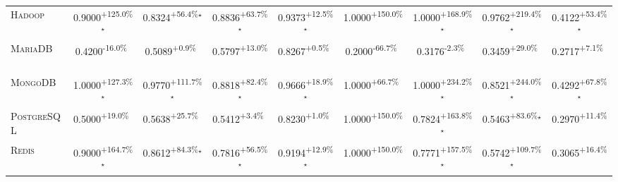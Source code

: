 \begin{table}[htbp]
\begin{tabular}{l|cccc|cccc}
\textsc{Hadoop} & \cellcolor{green!30}0.9000\textsuperscript{+125.0\%}$^\star$ & \cellcolor{green!30}0.8324\textsuperscript{+56.4\%}$^\star$ & \cellcolor{green!30}0.8836\textsuperscript{+63.7\%}$^\star$ & \cellcolor{green!30}0.9373\textsuperscript{+12.5\%}$^\star$ & \cellcolor{green!30}1.0000\textsuperscript{+150.0\%}$^{\,\,\,}$ & \cellcolor{green!30}1.0000\textsuperscript{+168.9\%}$^\star$ & \cellcolor{green!30}0.9762\textsuperscript{+219.4\%}$^\star$ & \cellcolor{green!30}0.4122\textsuperscript{+53.4\%}$^\star$ \\
\textsc{MariaDB} & \cellcolor{red!30}0.4200\textsuperscript{-16.0\%}$^{\,\,\,}$ & \cellcolor{green!30}0.5089\textsuperscript{+0.9\%}$^{\,\,\,}$ & \cellcolor{green!30}0.5797\textsuperscript{+13.0\%}$^{\,\,\,}$ & \cellcolor{green!30}0.8267\textsuperscript{+0.5\%}$^{\,\,\,}$ & \cellcolor{red!30}0.2000\textsuperscript{-66.7\%}$^{\,\,\,}$ & \cellcolor{red!30}0.3176\textsuperscript{-2.3\%}$^{\,\,\,}$ & \cellcolor{green!30}0.3459\textsuperscript{+29.0\%}$^{\,\,\,}$ & \cellcolor{green!30}0.2717\textsuperscript{+7.1\%}$^{\,\,\,}$ \\
\textsc{MongoDB} & \cellcolor{green!30}1.0000\textsuperscript{+127.3\%}$^\star$ & \cellcolor{green!30}0.9770\textsuperscript{+111.7\%}$^\star$ & \cellcolor{green!30}0.8818\textsuperscript{+82.4\%}$^\star$ & \cellcolor{green!30}0.9666\textsuperscript{+18.9\%}$^\star$ & \cellcolor{green!30}1.0000\textsuperscript{+66.7\%}$^{\,\,\,}$ & \cellcolor{green!30}1.0000\textsuperscript{+234.2\%}$^\star$ & \cellcolor{green!30}0.8521\textsuperscript{+244.0\%}$^\star$ & \cellcolor{green!30}0.4292\textsuperscript{+67.8\%}$^\star$ \\
\textsc{PostgreSQL} & \cellcolor{green!30}0.5000\textsuperscript{+19.0\%}$^{\,\,\,}$ & \cellcolor{green!30}0.5638\textsuperscript{+25.7\%}$^{\,\,\,}$ & \cellcolor{green!30}0.5412\textsuperscript{+3.4\%}$^{\,\,\,}$ & \cellcolor{green!30}0.8230\textsuperscript{+1.0\%}$^{\,\,\,}$ & \cellcolor{green!30}1.0000\textsuperscript{+150.0\%}$^{\,\,\,}$ & \cellcolor{green!30}0.7824\textsuperscript{+163.8\%}$^\star$ & \cellcolor{green!30}0.5463\textsuperscript{+83.6\%}$^\star$ & \cellcolor{green!30}0.2970\textsuperscript{+11.4\%}$^{\,\,\,}$ \\
\textsc{Redis} & \cellcolor{green!30}0.9000\textsuperscript{+164.7\%}$^\star$ & \cellcolor{green!30}0.8612\textsuperscript{+84.3\%}$^\star$ & \cellcolor{green!30}0.7816\textsuperscript{+56.5\%}$^\star$ & \cellcolor{green!30}0.9194\textsuperscript{+12.9\%}$^\star$ & \cellcolor{green!30}1.0000\textsuperscript{+150.0\%}$^{\,\,\,}$ & \cellcolor{green!30}0.7771\textsuperscript{+157.5\%}$^\star$ & \cellcolor{green!30}0.5742\textsuperscript{+109.7\%}$^\star$ & \cellcolor{green!30}0.3065\textsuperscript{+16.4\%}$^{\,\,\,}$ \\

\end{tabular}
\end{table}
